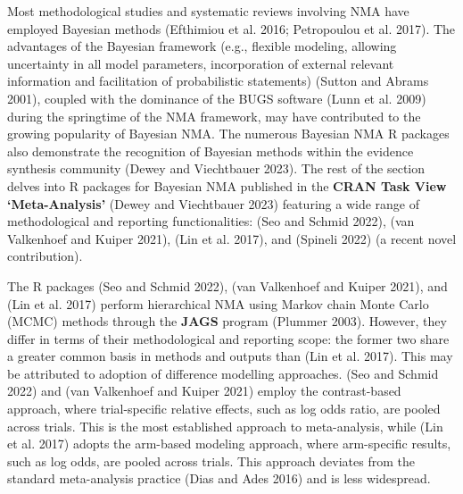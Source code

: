 Most methodological studies and systematic reviews involving NMA have employed
Bayesian methods (Efthimiou et al. 2016; Petropoulou et al. 2017). The advantages of the Bayesian
framework (e.g., flexible modeling, allowing uncertainty in all model parameters,
incorporation of external relevant information and facilitation of probabilistic
statements) (Sutton and Abrams 2001), coupled with the dominance of the BUGS software
(Lunn et al. 2009) during the springtime of the NMA framework, may have contributed to
the growing popularity of Bayesian NMA. The numerous Bayesian NMA R packages
also demonstrate the recognition of Bayesian methods within the evidence synthesis
community (Dewey and Viechtbauer 2023). The rest of the section delves into R packages for
Bayesian NMA published in the \textbf{CRAN Task View `Meta-Analysis'} (Dewey and Viechtbauer 2023)
featuring a wide range of methodological and reporting functionalities:  (Seo and Schmid 2022),
 (van Valkenhoef and Kuiper 2021),  (Lin et al. 2017), and 
(Spineli 2022) (a recent novel contribution).

The R packages  (Seo and Schmid 2022),  (van Valkenhoef and Kuiper 2021), and 
(Lin et al. 2017) perform hierarchical NMA using Markov chain Monte Carlo (MCMC) methods
through the \textbf{JAGS} program (Plummer 2003). However, they differ in terms of their
methodological and reporting scope: the former two share a greater common basis in methods and outputs
than  (Lin et al. 2017). This may be attributed to adoption of difference modelling approaches.
 (Seo and Schmid 2022) and  (van Valkenhoef and Kuiper 2021) employ the contrast-based approach, where
trial-specific relative effects, such as log odds ratio, are
pooled across trials. This is the most established approach to meta-analysis, while
 (Lin et al. 2017) adopts the arm-based modeling approach, where
arm-specific results, such as log odds, are pooled across trials. This approach
deviates from the standard meta-analysis practice (Dias and Ades 2016) and is less widespread.

